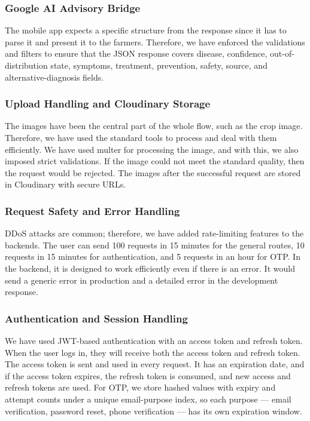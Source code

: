 \subsubsection{Google AI Advisory Bridge}

The mobile app expects a specific structure from the response since it has to parse it and present it to the farmers. Therefore, we have enforced the validations and filters to ensure that the JSON response covers disease, confidence,
out-of-distribution state, symptoms, treatment, prevention, safety, source, and
alternative-diagnosis fields. 


\subsubsection{Upload Handling and Cloudinary Storage}

The images have been the central part of the whole flow, such as the crop image. Therefore, we have used the standard tools to process and deal with them efficiently. We have used multer for processing the image, and with this, we also imposed strict validations. If the image could not meet the standard quality, then the request would be rejected. The images after the successful request are stored in Cloudinary with secure URLs. 

\subsubsection{Request Safety and Error Handling}

DDoS attacks are common; therefore, we have added rate-limiting features to the backends. The user can send 100 requests in 15 minutes for the general routes, 10 requests in 15 minutes for authentication, and 5 requests in an hour for OTP. In the backend, it is designed to work efficiently even if there is an error. It would send a generic error in production and a detailed error in the development response. 

\subsubsection{Authentication and Session Handling}

We have used JWT-based authentication with an access token and refresh token. When the user logs in, they will receive both the access token and refresh token. The access token is sent and used in every request. It has an expiration date, and if the access token expires, the refresh token is consumed, and new access and refresh tokens are used. For OTP, we store hashed values
with expiry and attempt counts under a unique email-purpose index, so each purpose --- email
verification, password reset, phone verification --- has its own expiration window.

